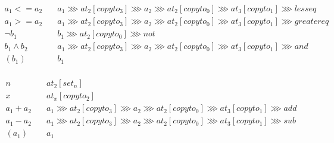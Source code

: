 \begin{align*}
    a_1<=a_2 \quad& 
    a_1 \ggg at_2[copyto_3] \ggg a_2 \ggg at_2[copyto_0] \ggg at_3[copyto_1] \ggg lesseq\\
    a_1>=a_2 \quad& 
    a_1 \ggg at_2[copyto_3] \ggg a_2 \ggg at_2[copyto_0] \ggg at_3[copyto_1] \ggg greatereq\\
    \neg b_1     \quad& b_1 \ggg at_2[copyto_0] \ggg not\\
    b_1 \land b_2\quad& 
    a_1 \ggg at_2[copyto_3] \ggg a_2 \ggg at_2[copyto_0] \ggg at_3[copyto_1] \ggg and\\
    (b_1)        \quad& b_1\\
\end{align*}

\begin{align*}
    n      \quad& at_2[set_n]\\
    x      \quad& at_x[copyto_2]\\
    a_1+a_2\quad& a_1 \ggg at_2[copyto_3] \ggg a_2 \ggg at_2[copyto_0] \ggg at_3[copyto_1] \ggg add\\
    a_1-a_2\quad& a_1 \ggg at_2[copyto_3] \ggg a_2 \ggg at_2[copyto_0] \ggg at_3[copyto_1] \ggg sub\\
    (a_1)  \quad& a_1\\
\end{align*}